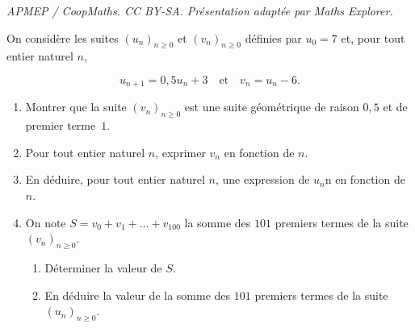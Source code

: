 \documentclass[10pt]{article}
\begin{document}
\noindent\textit{APMEP / CoopMaths. CC BY-SA. Présentation adaptée par Maths Explorer.}\par\medskip
\medskip

On considère les suites $\left(u_n\right)_{n\geqslant 0}$ et $\left(v_n\right)_{n\geqslant 0}$ définies par $u_0 = 7$ et, pour tout entier naturel $n$,

\[u_{n+1} = 0,5u_n + 3\quad \text{et}\quad v_n = u_n - 6.\]

\medskip

\begin{enumerate}
\item Montrer que la suite $\left(v_n\right)_{n\geqslant 0}$ est une suite géométrique de raison $0,5$ et de premier terme~$1$.
\item Pour tout entier naturel $n$, exprimer $v_n$ en fonction de $n$.
\item En déduire, pour tout entier naturel $n$, une expression de $u_n$n en fonction de $n$.
\item On note $S = v_0 + v_1 + \ldots + v_{100}$ la somme des $101$ premiers termes de la suite $\left(v_n\right)_{n\geqslant 0}$.
	\begin{enumerate}
		\item Déterminer la valeur de $S$.
		\item En déduire la valeur de la somme des $101$ premiers termes de la suite $\left(u_n\right)_{n\geqslant 0}$.
	\end{enumerate}
\end{enumerate}

\bigskip
\end{document}
